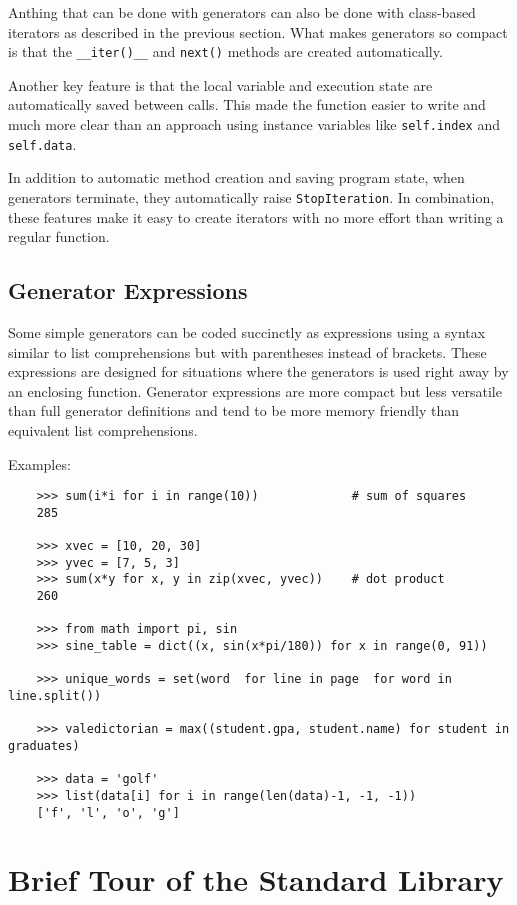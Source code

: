 \documentclass[UTF8]{article}
\begin{document}
Anthing that can be done with generators can also be done with class-based iterators as described
in the previous section. What makes generators so compact is that the \texttt{\_\_iter()\_\_} and
\texttt{next()} methods are created automatically.

Another key feature is that the local variable and execution state are automatically saved between
calls. This made the function easier to write and much more clear than an approach using instance
variables like \texttt{self.index} and \texttt{self.data}.

In addition to automatic method creation and saving program state, when generators terminate, they
automatically raise \texttt{StopIteration}. In combination, these features make it easy to create
iterators with no more effort than writing a regular function.

\subsection{Generator Expressions}
Some simple generators can be coded succinctly as expressions using a syntax similar to list
comprehensions but with parentheses instead of brackets. These expressions are designed for
situations where the generators is used right away by an enclosing function. Generator expressions
are more compact but less versatile than full generator definitions and tend to be more memory
friendly than equivalent list comprehensions.

Examples:
\begin{verbatim}
    >>> sum(i*i for i in range(10))             # sum of squares
    285

    >>> xvec = [10, 20, 30]
    >>> yvec = [7, 5, 3]
    >>> sum(x*y for x, y in zip(xvec, yvec))    # dot product
    260

    >>> from math import pi, sin
    >>> sine_table = dict((x, sin(x*pi/180)) for x in range(0, 91))

    >>> unique_words = set(word  for line in page  for word in line.split())

    >>> valedictorian = max((student.gpa, student.name) for student in graduates)

    >>> data = 'golf'
    >>> list(data[i] for i in range(len(data)-1, -1, -1))
    ['f', 'l', 'o', 'g']
\end{verbatim}

\section{Brief Tour of the Standard Library}
\end{document}
